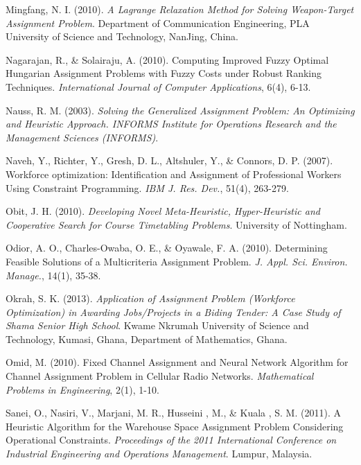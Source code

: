 \documentclass[11pt]{report}
\begin{document}
\begin{description}
		\item Mingfang, N. I. (2010). \emph{A Lagrange Relaxation Method for Solving Weapon-Target Assignment
		Problem}. Department of Communication Engineering, PLA University of Science and Technology, NanJing, China.
		
		\item Nagarajan, R., \& Solairaju, A. (2010). Computing Improved Fuzzy Optimal Hungarian Assignment Problems with Fuzzy Costs under Robust Ranking Techniques. \emph{International Journal of Computer Applications}, 6(4), 6-13.
		
		\item Nauss, R. M. (2003). \emph{Solving the Generalized Assignment Problem: An Optimizing and Heuristic Approach. INFORMS Institute for Operations Research and the Management Sciences
		(INFORMS)}.
		
		\item Naveh, Y., Richter, Y., Gresh, D. L., Altshuler, Y., \& Connors, D. P. (2007). Workforce
		optimization: Identification and Assignment of Professional Workers Using Constraint
		Programming. \emph{IBM J. Res. Dev.}, 51(4), 263-279.
		
		\item Obit, J. H. (2010). \emph{Developing Novel Meta-Heuristic, Hyper-Heuristic and Cooperative Search
		for Course Timetabling Problems}. University of Nottingham.
		
		\item Odior, A. O., Charles-Owaba, O. E., \& Oyawale, F. A. (2010). Determining Feasible Solutions of
		a Multicriteria Assignment Problem. \emph{J. Appl. Sci. Environ. Manage.}, 14(1), 35-38.
		
		\item Okrah, S. K. (2013). \emph{Application of Assignment Problem (Workforce Optimization) in Awarding Jobs/Projects in a Biding Tender: A Case Study of Shama Senior High School}. Kwame Nkrumah University of Science and Technology, Kumasi, Ghana, Department of Mathematics, Ghana. 
		
		\item Omid, M. (2010). Fixed Channel Assignment and Neural Network Algorithm for Channel Assignment Problem in Cellular Radio Networks. \emph{Mathematical Problems in Engineering}, 2(1), 1-10.
		
		\item Sanei, O., Nasiri, V., Marjani, M. R., Husseini , M., \& Kuala , S. M. (2011). A Heuristic Algorithm for the Warehouse Space Assignment Problem Considering Operational Constraints. \emph{Proceedings of the 2011 International Conference on Industrial Engineering and Operations Management}. Lumpur, Malaysia.
		

\end{description}
\end{document}
